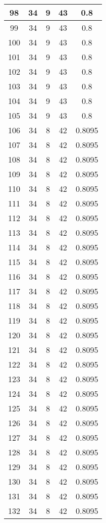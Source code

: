 \documentclass[letterpaper, 12pt]{article}
\begin{document}
\begin{longtable}{|c|c|c|c|c|}
\hline
98 & 34 & 9 & 43 & 0.8 \\
\hline
99 & 34 & 9 & 43 & 0.8 \\
\hline
100 & 34 & 9 & 43 & 0.8 \\
\hline
101 & 34 & 9 & 43 & 0.8 \\
\hline
102 & 34 & 9 & 43 & 0.8 \\
\hline
103 & 34 & 9 & 43 & 0.8 \\
\hline
104 & 34 & 9 & 43 & 0.8 \\
\hline
105 & 34 & 9 & 43 & 0.8 \\
\hline
106 & 34 & 8 & 42 & 0.8095 \\
\hline
107 & 34 & 8 & 42 & 0.8095 \\
\hline
108 & 34 & 8 & 42 & 0.8095 \\
\hline
109 & 34 & 8 & 42 & 0.8095 \\
\hline
110 & 34 & 8 & 42 & 0.8095 \\
\hline
111 & 34 & 8 & 42 & 0.8095 \\
\hline
112 & 34 & 8 & 42 & 0.8095 \\
\hline
113 & 34 & 8 & 42 & 0.8095 \\
\hline
114 & 34 & 8 & 42 & 0.8095 \\
\hline
115 & 34 & 8 & 42 & 0.8095 \\
\hline
116 & 34 & 8 & 42 & 0.8095 \\
\hline
117 & 34 & 8 & 42 & 0.8095 \\
\hline
118 & 34 & 8 & 42 & 0.8095 \\
\hline
119 & 34 & 8 & 42 & 0.8095 \\
\hline
120 & 34 & 8 & 42 & 0.8095 \\
\hline
121 & 34 & 8 & 42 & 0.8095 \\
\hline
122 & 34 & 8 & 42 & 0.8095 \\
\hline
123 & 34 & 8 & 42 & 0.8095 \\
\hline
124 & 34 & 8 & 42 & 0.8095 \\
\hline
125 & 34 & 8 & 42 & 0.8095 \\
\hline
126 & 34 & 8 & 42 & 0.8095 \\
\hline
127 & 34 & 8 & 42 & 0.8095 \\
\hline
128 & 34 & 8 & 42 & 0.8095 \\
\hline
129 & 34 & 8 & 42 & 0.8095 \\
\hline
130 & 34 & 8 & 42 & 0.8095 \\
\hline
131 & 34 & 8 & 42 & 0.8095 \\
\hline
132 & 34 & 8 & 42 & 0.8095 \\

\end{longtable}
\end{document}
